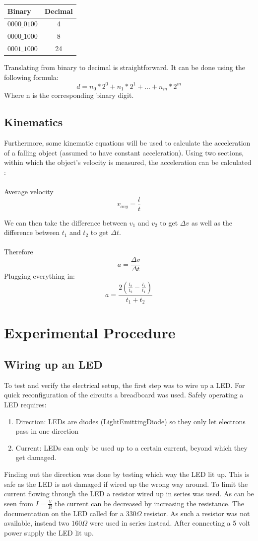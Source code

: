 \documentclass[fleqn,14pt]{article}
\begin{document}
\vspace{0.5cm}
\begin{tabular}{lc}
  Binary & Decimal\\
  \midrule
  $0000\_0100$ & 4\\
  $0000\_1000$ & 8\\
  $0001\_1000$ & 24\\
\end{tabular}
\vspace{0.5cm}


Translating from binary to decimal is straightforward. It can be done using the following formula:
$$
d=n_0\ast2^0+n_1\ast2^1+\ldots+n_m\ast2^m
$$
Where n is the corresponding binary digit.

\subsection{Kinematics}

Furthermore, some kinematic equations will be used to calculate the acceleration
of a falling object (assumed to have constant acceleration). Using two sections, within which
the object's velocity is measured,
the acceleration can be calculated :\\
\\
Average velocity
$$
v_{avg}=\frac{l}{t}
$$

We can then take the difference between $v_1$ and $v_2$ to get $\Delta v$ as well as the difference between
$t_1$ and $t_2$ to get $\Delta t$.\\
\\
Therefore
$$
a = \frac{\Delta v}{\Delta t}
$$
Plugging everything in:
$$
a = \frac{2(\frac{l_2}{t_2}-\frac{l_1}{t_1})}{t_1+t_2}
$$

\section{Experimental Procedure}
\subsection{Wiring up an LED}
To test and verify the electrical setup, the first step was to wire up a LED. For quick reconfiguration of
the circuits a breadboard was used. Safely operating a LED requires:
\begin{enumerate}
  \item Direction: LEDs are diodes (LightEmittingDiode) so they only let electrons pass in one direction
  \item Current: LEDs can only be used up to a certain current, beyond which they get damaged.
\end{enumerate}
Finding out the direction was done by testing which way the LED lit up. This is safe as the LED is not damaged
if wired up the wrong way around. To limit the current flowing through the LED a resistor wired up in
series was used. As can be seen from $I = \frac{V}{R}$ the current can be decreased by increasing the
resistance. The documentation on the LED called for a $330\Omega$ resistor. As such a resistor was not
available, instead two $160\Omega$ were used in series instead. After connecting a 5 volt power supply
the LED lit up.
\end{document}
